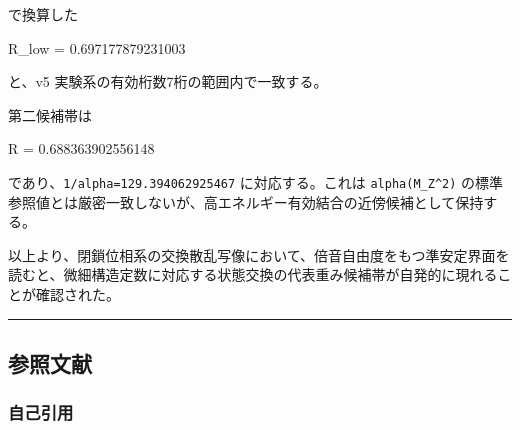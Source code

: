 \documentclass[
]{article}
\newenvironment{Shaded}{}{}
\newcommand{\NormalTok}[1]{#1}
\begin{document}
で換算した

\begin{Shaded}
\begin{Highlighting}[]
\NormalTok{R\_low = 0.697177879231003}
\end{Highlighting}
\end{Shaded}

と、v5 実験系の有効桁数7桁の範囲内で一致する。

第二候補帯は

\begin{Shaded}
\begin{Highlighting}[]
\NormalTok{R = 0.688363902556148}
\end{Highlighting}
\end{Shaded}

であり、\texttt{1/alpha=129.394062925467} に対応する。これは
\texttt{alpha(M\_Z\^{}2)}
の標準参照値とは厳密一致しないが、高エネルギー有効結合の近傍候補として保持する。

以上より、閉鎖位相系の交換散乱写像において、倍音自由度をもつ準安定界面を読むと、微細構造定数に対応する状態交換の代表重み候補帯が自発的に現れることが確認された。

\begin{center}\rule{0.5\linewidth}{0.5pt}\end{center}

\subsection{参照文献}\label{ux53c2ux7167ux6587ux732e}

\subsubsection{自己引用}\label{ux81eaux5df1ux5f15ux7528}
\end{document}
